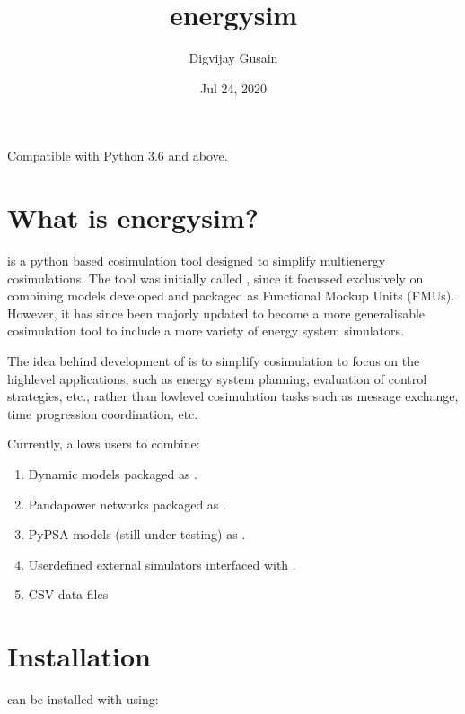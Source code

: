 \documentclass[letterpaper,10pt,english]{sphinxmanual}
\title{energysim}
\date{Jul 24, 2020}
\author{Digvijay Gusain}
\begin{document}
\pagestyle{empty}
\sphinxmaketitle
\pagestyle{plain}
\sphinxtableofcontents
\pagestyle{normal}
\label{\detokenize{index::doc}}


Compatible with Python 3.6 and above.


\chapter{What is energysim?}
\label{\detokenize{index:what-is-energysim}}
 is a python based cosimulation tool designed to simplify multi\sphinxhyphen{}energy cosimulations. The tool was initially called , since it focussed exclusively on combining models developed and packaged as Functional Mockup Units (FMUs). However, it has since been majorly updated to become a more generalisable cosimulation tool to include a more variety of energy system simulators.

The idea behind development of  is to simplify cosimulation to focus on the high\sphinxhyphen{}level applications, such as energy system planning, evaluation of control strategies, etc., rather than low\sphinxhyphen{}level cosimulation tasks such as message exchange, time progression coordination, etc.

Currently,  allows users to combine:
\begin{enumerate}
%
\item {} 
Dynamic models packaged as .

\item {} 
Pandapower networks packaged as .

\item {} 
PyPSA models (still under testing) as .

\item {} 
User\sphinxhyphen{}defined external simulators interfaced with .

\item {} 
CSV data files

\end{enumerate}

\noindent{}


\chapter{Installation}
\label{\detokenize{index:installation}}
 can be installed with  using:
\end{document}
